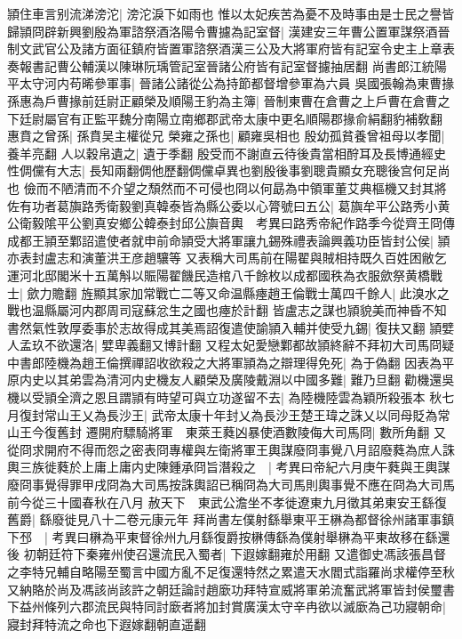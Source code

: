 頴住車言别流涕滂沱|{
	滂沱淚下如雨也}
惟以太妃疾苦為憂不及時事由是士民之譽皆歸頴冏辟新興劉殷為軍諮祭酒洛陽令曹攄為記室督|{
	漢建安三年曹公置軍謀祭酒晉制文武官公及諸方面征鎮府皆置軍諮祭酒漢三公及大將軍府皆有記室令史主上章表奏報書記曹公輔漢以陳琳阮瑀管記室晉諸公府皆有記室督攄抽居翻}
尚書郎江統陽平太守河内苟晞參軍事|{
	晉諸公諸從公為持節都督增參軍為六員}
吳國張翰為東曹掾孫惠為戶曹掾前廷尉正顧榮及順陽王豹為主簿|{
	晉制東曹在倉曹之上戶曹在倉曹之下廷尉屬官有正監平魏分南陽立南鄉郡武帝太康中更名順陽郡掾俞絹翻豹補敎翻}
惠賁之曾孫|{
	孫賁吴主權從兄}
榮雍之孫也|{
	顧雍吳相也}
殷幼孤貧養曾祖母以孝聞|{
	養羊亮翻}
人以穀帛遺之|{
	遺于季翻}
殷受而不謝直云待後貴當相酧耳及長博通經史性倜儻有大志|{
	長知兩翻倜他歷翻倜儻卓異也劉殷後事劉聰貴顯女充聰後宫何足尚也}
儉而不陋清而不介望之頹然而不可侵也冏以何勗為中領軍董艾典樞機又封其將佐有功者葛旟路秀衛毅劉真韓泰皆為縣公委以心膂號曰五公|{
	葛旟牟平公路秀小黄公衛毅隂平公劉真安鄉公韓泰封邱公旟音輿　考異曰路秀帝紀作路季今從齊王冏傳}
成都王頴至鄴詔遣使者就申前命頴受大將軍讓九錫殊禮表論興義功臣皆封公侯|{
	頴亦表封盧志和演董洪王彦趙驤等}
又表稱大司馬前在陽翟與賊相持既久百姓困敝乞運河北邸閣米十五萬斛以賑陽翟饑民造棺八千餘枚以成都國秩為衣服歛祭黄橋戰士|{
	歛力贍翻}
旌顯其家加常戰亡二等又命温縣瘞趙王倫戰士萬四千餘人|{
	此溴水之戰也温縣屬河内郡周司寇蘇忿生之國也瘞於計翻}
皆盧志之謀也頴貌美而神昏不知書然氣性敦厚委事於志故得成其美焉詔復遣使諭頴入輔并使受九錫|{
	復扶又翻}
頴嬖人孟玖不欲還洛|{
	嬖卑義翻又博計翻}
又程太妃愛戀鄴都故頴終辭不拜初大司馬冏疑中書郎陸機為趙王倫撰禪詔收欲殺之大將軍頴為之辯理得免死|{
	為于偽翻}
因表為平原内史以其弟雲為清河内史機友人顧榮及廣陵戴淵以中國多難|{
	難乃旦翻}
勸機還吳機以受頴全濟之恩且謂頴有時望可與立功遂留不去|{
	為陸機陸雲為穎所殺張本}
秋七月復封常山王乂為長沙王|{
	武帝太康十年封乂為長沙王楚王瑋之誅乂以同母貶為常山王今復舊封}
遷開府驃騎將軍　東萊王蕤凶暴使酒數陵侮大司馬冏|{
	數所角翻}
又從冏求開府不得而怨之密表冏專權與左衛將軍王輿謀廢冏事覺八月詔廢蕤為庶人誅輿三族徙蕤於上庸上庸内史陳鍾承冏旨潛殺之　|{
	考異曰帝紀六月庚午蕤與王輿謀廢冏事覺得罪甲戌冏為大司馬按誅輿詔已稱冏為大司馬則輿事覺不應在冏為大司馬前今從三十國春秋在八月}
赦天下　東武公澹坐不孝徙遼東九月徵其弟東安王繇復舊爵|{
	繇廢徙見八十二卷元康元年}
拜尚書左僕射繇舉東平王楙為都督徐州諸軍事鎮下邳　|{
	考異曰楙為平東督徐州九月繇復爵按楙傳繇為僕射舉楙為平東故移在繇還後}
初朝廷符下秦雍州使召還流民入蜀者|{
	下遐嫁翻雍於用翻}
又遣御史馮該張昌督之李特兄輔自略陽至蜀言中國方亂不足復還特然之累遣天水閻式詣羅尚求權停至秋又納賂於尚及馮該尚該許之朝廷論討趙廞功拜特宣威將軍弟流奮武將軍皆封侯璽書下益州條列六郡流民與特同討廞者將加封賞廣漢太守辛冉欲以滅廞為己功寢朝命|{
	寢封拜特流之命也下遐嫁翻朝直遥翻}
